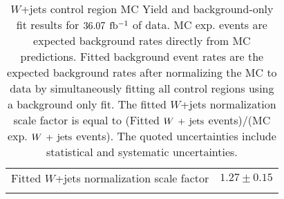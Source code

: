 \begin{table}[h!]
\begin{center}
{\begin{tabular*}{\textwidth}{@{\extracolsep{\fill}}lr}
\noalign{\smallskip}\hline\noalign{\smallskip}
Fitted $W$+jets normalization scale factor & $1.27 \pm 0.15$ \\
\noalign{\smallskip}\hline\noalign{\smallskip}
\end{tabular*}
}
\end{center}
\caption[$W$+jets control region MC Yield and background-only fit results for $\intlumi$ $\ifb$ of data]{$W$+jets control region MC Yield and background-only fit results for $\intlumi$ $\ifb$ of data. MC exp. events are expected background rates directly from MC predictions.  Fitted background event rates are the expected background rates after normalizing the MC to data by simultaneously fitting all control regions using a background only fit.  The fitted $W$+jets normalization scale factor is equal to (Fitted $W\,+\,\mathrm{jets}$ events)/(MC exp. $W\,+\,\mathrm{jets}$ events). The quoted uncertainties include statistical and systematic uncertainties. }
\label{table.bkgonly.CRW}
\end{table}
%